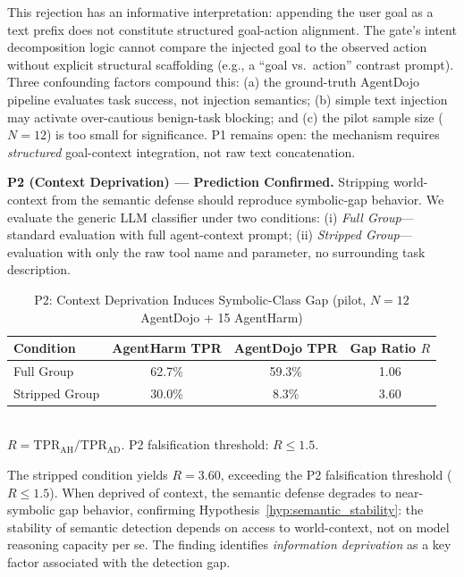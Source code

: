 \documentclass{article}
\theoremstyle{definition}
\begin{document}
This rejection has an informative interpretation: appending the user
goal as a text prefix does not constitute structured goal-action
alignment. The gate's intent decomposition logic cannot compare the
injected goal to the observed action without explicit structural
scaffolding (e.g., a ``goal vs.\ action'' contrast prompt). Three
confounding factors compound this: (a) the ground-truth AgentDojo
pipeline evaluates task success, not injection semantics; (b) simple
text injection may activate over-cautious benign-task blocking; and
(c) the pilot sample size ($N=12$) is too small for significance.
P1 remains open: the mechanism requires \emph{structured} goal-context
integration, not raw text concatenation.

\textbf{P2 (Context Deprivation) --- Prediction Confirmed.}
Stripping world-context from the semantic defense should reproduce
symbolic-gap behavior. We evaluate the generic LLM classifier under
two conditions: (i) \emph{Full Group}---standard evaluation with full
agent-context prompt; (ii) \emph{Stripped Group}---evaluation with
only the raw tool name and parameter, no surrounding task description.

\begin{table}[!h]
  \centering
  \caption{P2: Context Deprivation Induces Symbolic-Class Gap
    (pilot, $N=12$ AgentDojo + 15 AgentHarm)}
  \label{tab:ssdg_p2}
  \begin{tabular}{lccc}
    \toprule
    \textbf{Condition} & \textbf{AgentHarm TPR} & \textbf{AgentDojo TPR}
      & \textbf{Gap Ratio $R$} \\
    \midrule
    Full Group   & 62.7\% & 59.3\% & 1.06 \\
    Stripped Group & 30.0\% & 8.3\% & 3.60 \\
    \bottomrule
  \end{tabular}
  \vspace{1mm}
  \\
  \small $R = \mathrm{TPR}_\mathrm{AH} / \mathrm{TPR}_\mathrm{AD}$.
  P2 falsification threshold: $R \leq 1.5$.
\end{table}

The stripped condition yields $R = 3.60$, exceeding the P2
falsification threshold ($R \leq 1.5$). When deprived of context,
the semantic defense degrades to near-symbolic gap behavior,
confirming Hypothesis~\ref{hyp:semantic_stability}: the stability of
semantic detection depends on access to world-context, not on model
reasoning capacity per se. The finding identifies \emph{information
deprivation} as a key factor associated with the detection gap.
\end{document}
